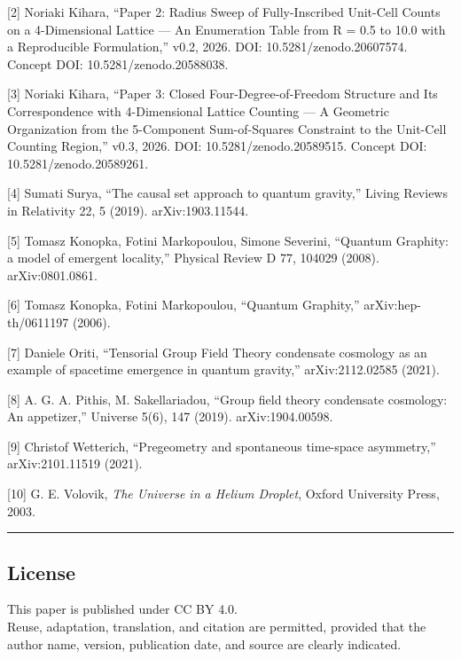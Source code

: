 \documentclass[
]{article}
\begin{document}
{[}2{]} Noriaki Kihara, ``Paper 2: Radius Sweep of Fully-Inscribed
Unit-Cell Counts on a 4-Dimensional Lattice --- An Enumeration Table
from R = 0.5 to 10.0 with a Reproducible Formulation,'' v0.2, 2026. DOI:
10.5281/zenodo.20607574. Concept DOI: 10.5281/zenodo.20588038.

{[}3{]} Noriaki Kihara, ``Paper 3: Closed Four-Degree-of-Freedom
Structure and Its Correspondence with 4-Dimensional Lattice Counting ---
A Geometric Organization from the 5-Component Sum-of-Squares Constraint
to the Unit-Cell Counting Region,'' v0.3, 2026. DOI:
10.5281/zenodo.20589515. Concept DOI: 10.5281/zenodo.20589261.

{[}4{]} Sumati Surya, ``The causal set approach to quantum gravity,''
Living Reviews in Relativity 22, 5 (2019). arXiv:1903.11544.

{[}5{]} Tomasz Konopka, Fotini Markopoulou, Simone Severini, ``Quantum
Graphity: a model of emergent locality,'' Physical Review D 77, 104029
(2008). arXiv:0801.0861.

{[}6{]} Tomasz Konopka, Fotini Markopoulou, ``Quantum Graphity,''
arXiv:hep-th/0611197 (2006).

{[}7{]} Daniele Oriti, ``Tensorial Group Field Theory condensate
cosmology as an example of spacetime emergence in quantum gravity,''
arXiv:2112.02585 (2021).

{[}8{]} A. G. A. Pithis, M. Sakellariadou, ``Group field theory
condensate cosmology: An appetizer,'' Universe 5(6), 147 (2019).
arXiv:1904.00598.

{[}9{]} Christof Wetterich, ``Pregeometry and spontaneous time-space
asymmetry,'' arXiv:2101.11519 (2021).

{[}10{]} G. E. Volovik, \emph{The Universe in a Helium Droplet}, Oxford
University Press, 2003.

\begin{center}\rule{0.5\linewidth}{0.5pt}\end{center}

\subsection{License}\label{license}

This paper is published under CC BY 4.0.\\
Reuse, adaptation, translation, and citation are permitted, provided
that the author name, version, publication date, and source are clearly
indicated.
\end{document}
